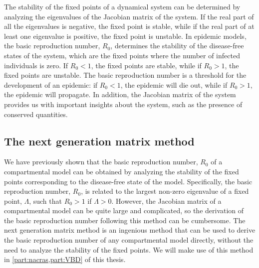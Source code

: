 \begin{remark}
  The stability of the fixed points of a dynamical system can be determined by
  analyzing the eigenvalues of the Jacobian matrix of the system. If the real
  part of all the eigenvalues is negative, the fixed point is stable, while if
  the real part of at least one eigenvalue is positive, the fixed point is
  unstable. In epidemic models, the basic reproduction number, $R_0$,
  determines the	stability of the disease-free states of the system,
  which are the fixed	points where the number of infected individuals is
  zero. If $R_0<1$, the fixed points are stable, while if $R_0>1$, the fixed
  points are unstable. The basic reproduction number is a threshold for the
  development of an epidemic: if $R_0<1$, the epidemic will die out, while if
  $R_0>1$, the epidemic will propagate. In addition, the Jacobian matrix of the
  system provides us with important insights about the system, such as the
  presence of conserved quantities.
\end{remark}

\subsection{The next generation matrix method}
We have previously shown that the basic reproduction number, $R_0$ of a
compartmental model can be obtained by analyzing the stability of the fixed
points corresponding to the disease-free state of the model. Specifically, the
basic reproduction number, $R_0$, is related to the largest non-zero eigenvalue
of a fixed point, $\Lambda$, such that $R_0>1$ if $\Lambda>0$. However, the
Jacobian matrix of a compartmental model can be quite large and complicated, so
the derivation of the basic reproduction number following this method can be
cumbersome. The next generation matrix method is an ingenious method that can
be used to derive the basic reproduction number of any compartmental model
directly, without the need to analyze the stability of the fixed points. We
will make use of this method in \cref{part:nacras,part:VBD} of this thesis.

